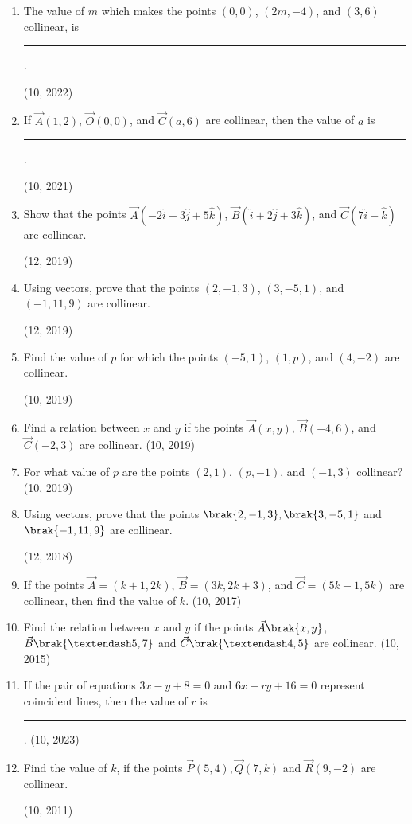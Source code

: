 \begin{enumerate}[label=\thesubsection.\arabic*, ref=\thesubsection.\theenumi]
	\item The value of $m$ which makes the points $(0,0)$, $(2m, -4)$, and $(3,6)$ collinear, is \rule{1cm}{0.2pt}.

    \hfill (10, 2022)
		\item If $\vec{A}(1, 2)$, $\vec{O}(0, 0)$, and $\vec{C}(a, 6)$ are collinear, then the value of $a$ is
\rule{1cm}{0.2pt}.

		\hfill (10, 2021)
	\item Show that the points $\vec{A}(-2\hat{i} + 3\hat{j} + 5\hat{k})$, $\vec{B}(\hat{i} + 2\hat{j} + 3\hat{k})$, and $\vec{C}(7\hat{i} - \hat{k})$ are collinear.

		\hfill (12, 2019)
	\item Using vectors, prove that the points $(2, -1, 3)$, $(3, -5, 1)$, and $(-1, 11, 9)$ are collinear.

		\hfill (12, 2019)
\item Find the value of $p$ for which the points $(-5, 1)$, $(1, p)$, and $(4, -2)$ are collinear.

	\hfill (10, 2019)
\item Find a relation between $x$ and $y$ if the points $\vec{A}(x, y)$, $\vec{B}(-4, 6)$, and $\vec{C}(-2, 3)$ are collinear. \hfill (10, 2019)
\item For what value of $p$ are the points $(2, 1)$, $(p, -1)$, and $(-1, 3)$ collinear? \hfill (10, 2019)
\item Using vectors, prove that the points $\brak{2,-1,3},\brak{3,-5,1}$ and $\brak{-1,11,9}$ are collinear.

\hfill (12, 2018) 
\item If the points $\vec{A} = (k+1, 2k)$, $\vec{B} = (3k, 2k + 3)$, and $\vec{C} = (5k-1, 5k)$ are collinear, then find the value of $k$. \hfill (10, 2017)
\item Find the relation between $x$ and $y$ if the points $\vec{A}\brak{x,y}$, $\vec{B}\brak{–5,7}$ and $\vec{C}\brak{–4, 5}$ are collinear. \hfill (10, 2015)
  \item If the pair of equations $3x-y+8=0$ and $6x-ry+16=0$ represent coincident lines, then the value of $r$ is
\rule{1cm}{0.2pt}.
     \hfill (10, 2023)
    \item Find the value of $k$, if the points $\vec{P}(5,4),\vec{Q}(7,k)$ and $\vec{R}(9,-2)$ are collinear.

\hfill (10, 2011)
\end{enumerate}
